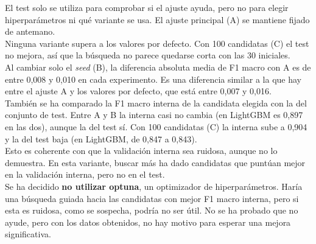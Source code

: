 El test solo se utiliza para comprobar si el ajuste ayuda, pero no para elegir hiperparámetros ni qué variante se usa. El ajuste principal (A) se mantiene fijado de antemano.
\\

Ninguna variante supera a los valores por defecto. Con 100 candidatas (C) el test no mejora, así que la búsqueda no parece quedarse corta con las 30 iniciales.
\\

Al cambiar solo el \textit{seed} (B), la diferencia absoluta media de F1 macro con A es de entre 0,008 y 0,010 en cada experimento. Es una diferencia similar a la que hay entre el ajuste A y los valores por defecto, que está entre 0,007 y 0,016.
\\

También se ha comparado la F1 macro interna de la candidata elegida con la del conjunto de test. Entre A y B la interna casi no cambia (en LightGBM es 0,897 en las dos), aunque la del test sí. Con 100 candidatas (C) la interna sube a 0,904 y la del test baja (en LightGBM, de 0,847 a 0,843).
\\

Esto es coherente con que la validación interna sea ruidosa, aunque no lo demuestra. En esta variante, buscar más ha dado candidatas que puntúan mejor en la validación interna, pero no en el test.
\\

Se ha decidido \textbf{no utilizar \gls{optuna}}, un optimizador de hiperparámetros. Haría una búsqueda guiada \parencite{radecic_2026} hacia las candidatas con mejor F1 macro interna, pero si esta es ruidosa, como se sospecha, podría no ser útil. No se ha probado que no ayude, pero con los datos obtenidos, no hay motivo para esperar una mejora significativa.
\\


